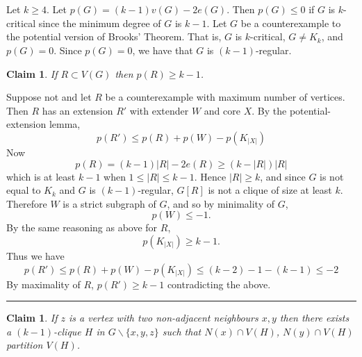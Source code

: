 \documentclass[letterpaper,12pt,oneside,onecolumn]{article}
\newenvironment{proof}{{\bf Proof:  }}{\hfill\rule{2mm}{2mm}}
\newtheorem{claim}[fact]{Claim}
\begin{document}
\section{}
\paragraph{}
Let $k \geq 4$. Let $p(G) = (k-1)v(G) - 2e(G)$. Then $p(G) \leq 0$ if $G$ is $k$-critical since the minimum degree of $G$ is $k-1$. Let $G$ be a counterexample to the potential version of Brooks' Theorem. That is, $G$ is $k$-critical, $G\neq K_k$, and $p(G) = 0$. Since $p(G) = 0$, we have that $G$ is $(k-1)$-regular.
\begin{claim}
If $R \subset V(G)$ then $p(R) \geq k-1$.
\end{claim}
\begin{proof}
Suppose not and let $R$ be a counterexample with maximum number of vertices. Then $R$ has an extension $R'$ with extender $W$ and core $X$. By the potential-extension lemma,
$$p(R') \leq p(R) + p(W) - p(K_{|X|})$$
Now $$p(R) =  (k-1)|R| - 2e(R) \geq (k-|R|)|R|$$
which is at least $k-1$ when $1 \leq |R| \leq k-1$. Hence $|R| \geq k$, and since $G$ is not equal to $K_k$ and $G$ is $(k-1)$-regular, $G[R]$ is not a clique of size at least $k$. Therefore $W$ is a strict subgraph of $G$, and so by minimality of $G$,
$$p(W) \leq -1.$$
By the same reasoning as above for $R$, $$p(K_{|X|}) \geq k-1.$$
Thus we have
$$p(R') \leq p(R) + p(W) - p(K_{|X|}) \leq (k-2)  - 1 -(k-1) \leq - 2$$
By maximality of $R$, $p(R') \geq k-1$ contradicting the above.
\end{proof}
\begin{claim}
If $z$ is a vertex with two non-adjacent neighbours $x,y$ then there exists a $(k-1)$-clique $H$ in $G\backslash \{x,y,z\}$ such that $N(x) \cap V(H)$, $N(y) \cap V(H)$ partition $V(H)$.
\end{claim}
\end{document}
